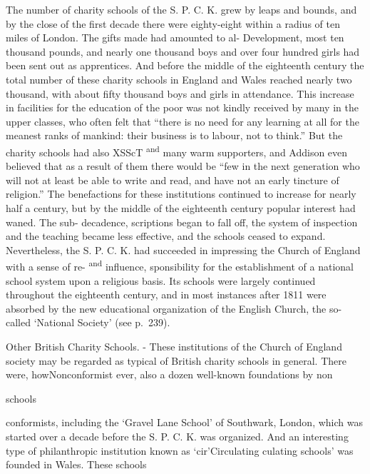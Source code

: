 \documentclass[]{book}
\begin{document}
The number of charity schools of the S. P. C. K. grew by leaps and bounds, and by the close of the first decade there were eighty-eight within a radius of ten\protect\hypertarget{ch20.xmlux5cux23para.292.1.0.box.129.228.1263.1556.q.60}{}{ miles of London. The gifts made had amounted to al- Development, most ten thousand pounds, and nearly one thousand boys and over four hundred girls had been sent out as apprentices. And before the middle of the eighteenth century the total number of these charity schools in England and Wales reached nearly two thousand, with about fifty thousand boys and girls in attendance. This increase in facilities for the education of the poor was not kindly received by many in the upper classes, who often felt that ``there is no need for any learning at all for the meanest ranks of mankind: their business is to labour, not to think.'' But the charity schools had also XSScT \textsuperscript{and} many warm supporters, and Addison even believed that as a result of them there would be ``few in the next generation who will not at least be able to write and read, and have not an early tincture of religion.'' The benefactions for these institutions continued to increase for nearly half a century, but by the middle of the eighteenth century popular interest had waned. The sub- decadence, scriptions began to fall off, the system of inspection and the teaching became less effective, and the schools ceased to expand. Nevertheless, the S. P. C. K. had succeeded in impressing the Church of England with a sense of re- \textsuperscript{and} influence, sponsibility for the establishment of a national school system upon a religious basis. Its schools were largely continued throughout the eighteenth century, and in most instances after 1811 were absorbed by the new educational organization of the English Church, the so-called `National Society' (see p.~239).}

Other British Charity Schools. - These institutions of the Church of England society may be regarded as typical of British charity schools in general. There were, how\protect\hypertarget{ch20.xmlux5cux23para.293.1.0.box.78.236.1269.43.q.60}{}{Nonconformist ever, also a dozen well-known foundations by non}

schools

conformists, including the `Gravel Lane School' of Southwark, London, which was started over a decade before the S. P. C. K. was organized. And an interesting type of philanthropic institution known as `cir'Circulating culating schools' was founded in Wales. These schools
\end{document}
